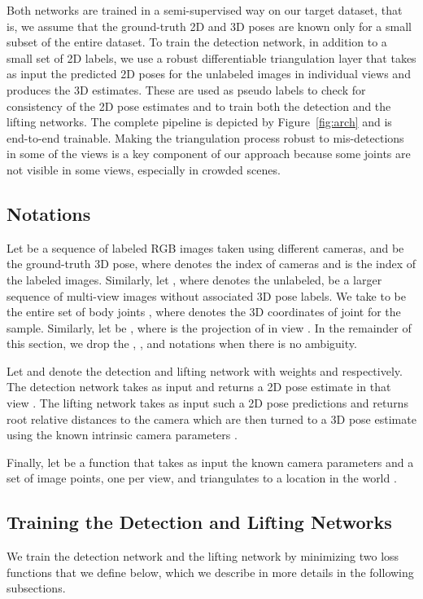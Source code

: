\documentclass[runningheads]{llncs}
\begin{document}
Both networks are trained in a semi-supervised way on our target dataset, that is, we assume that the ground-truth 2D and 3D poses are known only for a small subset of the entire dataset. To train the detection network, in addition to a small set of 2D labels, we use a robust differentiable triangulation layer that takes as input the predicted 2D poses for the unlabeled images in individual views and produces the 3D estimates. These are used as pseudo labels to check for consistency of the 2D pose estimates and to train both the detection and the lifting networks. The complete pipeline is depicted by Figure~\ref{fig:arch} and is end-to-end trainable. Making the triangulation process robust to mis-detections in some of the views is a key component of our approach because some joints are not visible in some views, especially in crowded scenes. 

\subsection{Notations}
Let  be a sequence of labeled RGB images  taken using  different cameras, and  be the ground-truth 3D pose, where  denotes the index of cameras and  is the index of the labeled images. Similarly, let , where  denotes the unlabeled, be a larger sequence of multi-view images without associated 3D pose labels. We take  to be the entire set of body joints , where  denotes the 3D coordinates of joint  for the  sample. Similarly, let  be , where  is the projection of  in view . In the remainder of this section, we drop the , , and  notations when there is no ambiguity. 
 
Let    and  denote the detection and lifting network with weights  and  respectively. The detection network  takes  as input and returns a 2D pose estimate in that view . The lifting network  takes as input such a 2D pose predictions and returns root relative distances to the camera which are then turned to a 3D pose estimate  using the known intrinsic camera parameters . 

Finally, let  be a function that takes as input the known camera parameters and a set of image points, one per view, and triangulates to a location in the world .

\subsection{Training the Detection and Lifting Networks}
\label{sec:losses}

We train the detection network   and the lifting network  by minimizing two loss functions that we define below, which we describe in more details in the following subsections.
\end{document}
